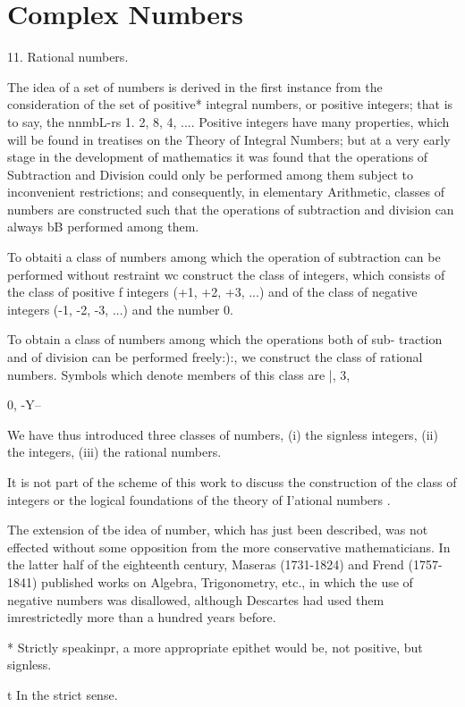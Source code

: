 \chapter{Complex Numbers} 

11. Rational numbers.

The idea of a set of numbers is derived in the first instance from the
consideration of the set of positive* integral numbers, or positive
integers; that is to say, the nnmbL-rs 1. 2, 8, 4, .... Positive
integers have many properties, which will be found in treatises on the
Theory of Integral Numbers; but at a very early stage in the
development of mathematics it was found that the operations of
Subtraction and Division could only be performed among them subject to
inconvenient restrictions; and consequently, in elementary
Arithmetic, classes of numbers are constructed such that the
operations of subtraction and division can always bB performed among
them.

To obtaiti a class of numbers among which the operation of subtraction
can be performed without restraint wc construct the class of integers,
which consists of the class of positive f integers (+1, +2, +3, ...)
and of the class of negative integers (-1, -2, -3, ...) and the number
0.

To obtain a class of numbers among which the operations both of sub-
traction and of division can be performed freely:):, we construct the
class of rational numbers. Symbols which denote members of this class
are |, 3,

0, -Y--

We have thus introduced three classes of numbers, (i) the signless
integers, (ii) the integers, (iii) the rational numbers.

It is not part of the scheme of this work to discuss the construction
of the class of integers or the logical foundations of the theory of
I'ational numbers .

The extension of tbe idea of number, which has just been described,
was not effected without some opposition from the more conservative
mathematicians. In the latter half of the eighteenth century, Maseras
(1731-1824) and Frend (1757-1841) published works on Algebra,
Trigonometry, etc., in which the use of negative numbers was
disallowed, although Descartes had used them imrestrictedly more than
a hundred years before.

* Strictly speakinpr, a more appropriate epithet would be, not
positive, but signless.

t In the strict sense.

